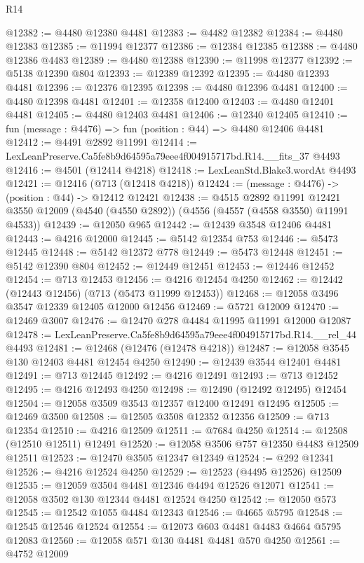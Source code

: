 \begin{lexlean}{R14}
\begin{coremodule}
@12382 := @4480 @12380 @4481
@12383 := @4482 @12382
@12384 := @4480 @12383
@12385 := @11994 @12377
@12386 := @12384 @12385
@12388 := @4480 @12386 @4483
@12389 := @4480 @12388
@12390 := @11998 @12377
@12392 := @5138 @12390 @804
@12393 := @12389 @12392
@12395 := @4480 @12393 @4481
@12396 := @12376 @12395
@12398 := @4480 @12396 @4481
@12400 := @4480 @12398 @4481
@12401 := @12358 @12400
@12403 := @4480 @12401 @4481
@12405 := @4480 @12403 @4481
@12406 := @12340 @12405
@12410 := fun (message : @4476) => fun (position : @44) => @4480 @12406 @4481
@12412 := @4491 @2892 @11991
@12414 := LexLeanPreserve.Ca5fe8b9d64595a79eee4f004915717bd.R14.__fits_37 @4493
@12416 := @4501 (@12414 @4218)
@12418 := LexLeanStd.Blake3.wordAt @4493
@12421 := @12416 (@713 (@12418 @4218))
@12424 := (message : @4476) -> (position : @44) -> @12412 @12421
@12438 := @4515
    @2892
    @11991
    @12421
    @3550
    @12009
    (@4540 (@4550 @2892))
    (@4556 (@4557 (@4558 @3550) @11991 @4533))
@12439 := @12050 @965
@12442 := @12439 @3548 @12406 @4481
@12443 := @4216 @12000
@12445 := @5142 @12354 @753
@12446 := @5473 @12445
@12448 := @5142 @12372 @778
@12449 := @5473 @12448
@12451 := @5142 @12390 @804
@12452 := @12449 @12451
@12453 := @12446 @12452
@12454 := @713 @12453
@12456 := @4216 @12454 @4250
@12462 := @12442 (@12443 @12456) (@713 (@5473 @11999 @12453))
@12468 := @12058 @3496 @3547 @12339 @12405 @12000 @12456
@12469 := @5721 @12009
@12470 := @12469 @3007
@12476 := @12470 @278 @4484 @11995 @11991 @12000 @12087
@12478 := LexLeanPreserve.Ca5fe8b9d64595a79eee4f004915717bd.R14.__rel_44 @4493
@12481 := @12468 (@12476 (@12478 @4218))
@12487 := @12058 @3545 @130 @12403 @4481 @12454 @4250
@12490 := @12439 @3544 @12401 @4481
@12491 := @713 @12445
@12492 := @4216 @12491
@12493 := @713 @12452
@12495 := @4216 @12493 @4250
@12498 := @12490 (@12492 @12495) @12454
@12504 := @12058 @3509 @3543 @12357 @12400 @12491 @12495
@12505 := @12469 @3500
@12508 := @12505 @3508 @12352 @12356
@12509 := @713 @12354
@12510 := @4216 @12509
@12511 := @7684 @4250
@12514 := @12508 (@12510 @12511) @12491
@12520 := @12058 @3506 @757 @12350 @4483 @12509 @12511
@12523 := @12470 @3505 @12347 @12349
@12524 := @292 @12341
@12526 := @4216 @12524 @4250
@12529 := @12523 (@4495 @12526) @12509
@12535 := @12059 @3504 @4481 @12346 @4494 @12526 @12071
@12541 := @12058 @3502 @130 @12344 @4481 @12524 @4250
@12542 := @12050 @573
@12545 := @12542 @1055 @4484 @12343
@12546 := @4665 @5795
@12548 := @12545 @12546 @12524
@12554 := @12073 @603 @4481 @4483 @4664 @5795 @12083
@12560 := @12058 @571 @130 @4481 @4481 @570 @4250
@12561 := @4752 @12009

\end{coremodule}
\end{lexlean}
